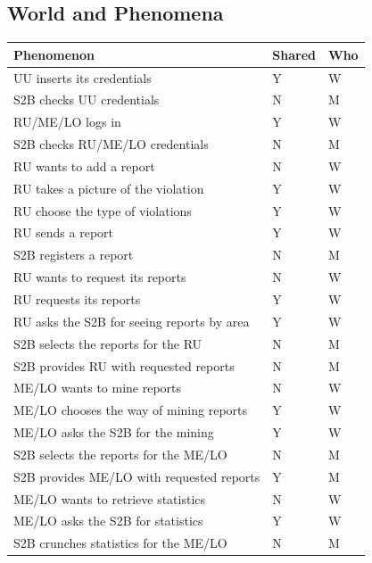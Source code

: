 			\subsection{World and Phenomena}
				\begin{table}[!h]
					\begin{center}
						\begin{tabular}{L{0.73\textwidth}P{0.1\textwidth}P{0.059\textwidth}}
							\toprule
								Phenomenon & Shared & Who \\
							\midrule
								UU inserts its credentials & Y & W \\[1mm]
								S2B checks UU credentials & N & M \\[1mm]
								RU/ME/LO logs in & Y & W \\[1mm]
								S2B checks RU/ME/LO credentials & N & M \\[1mm]
								RU wants to add a report & N & W \\[1mm]
								RU takes a picture of the violation & Y & W \\[1mm]
								RU choose the type of violations & Y & W \\[1mm]
								RU sends a report & Y & W \\[1mm]								
								S2B registers a report & N & M \\[1mm]
								RU wants to request its reports & N & W \\[1mm]
								RU requests its reports & Y & W \\[1mm]
								RU asks the S2B for seeing reports by area & Y & W \\[1mm]
								S2B selects the reports for the RU & N & M \\[1mm]
								S2B provides RU with requested reports & N & M \\[1mm]
								ME/LO wants to mine reports & N  & W \\[1mm]
								ME/LO chooses the way of mining reports & Y & W \\[1mm]
								ME/LO asks the S2B for the mining & Y & W \\[1mm]
								S2B selects the reports for the ME/LO & N & M \\[1mm]
								S2B provides ME/LO with requested reports & Y & M \\[1mm]			
								ME/LO wants to retrieve statistics & N & W \\[1mm]
								ME/LO asks the S2B for statistics & Y & W \\[1mm]
								S2B crunches statistics for the ME/LO & N & M \\[1mm]

\end{tabular}
\end{center}
\end{table}
